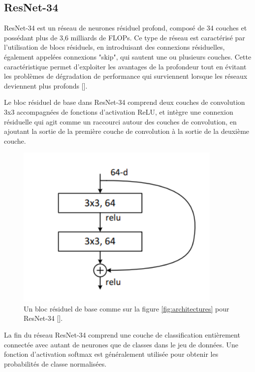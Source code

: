 \subsection{ResNet-34}
ResNet-34 est un réseau de neurones résiduel profond, composé de 34 couches et possédant plus de 3,6 milliards de FLOPs. Ce type de réseau est caractérisé par l'utilisation de blocs résiduels, en introduisant des connexions résiduelles, également appelées connexions "skip", qui sautent une ou plusieurs couches. Cette caractéristique permet d'exploiter les avantages de la profondeur tout en évitant les problèmes de dégradation de performance qui surviennent lorsque les réseaux deviennent plus profonds [\cite{He_2016_CVPR}].

Le bloc résiduel de base dans ResNet-34 comprend deux couches de convolution 3x3 accompagnées de fonctions d'activation ReLU, et intègre une connexion résiduelle qui agit comme un raccourci autour des couches de convolution, en ajoutant la sortie de la première couche de convolution à la sortie de la deuxième couche. 

\begin{figure}[hbt!]
  \centering
  \includegraphics[width=10cm]{images_pfe/residual-bloc.png}
  \caption{Un bloc résiduel de base comme sur la figure \ref{fig:architectures} pour ResNet-34 [\cite{He_2016_CVPR}].}
  \label{fig:residual-bloc}
\end{figure}
\FloatBarrier
\medskip

La fin du réseau ResNet-34 comprend une couche de classification entièrement connectée avec autant de neurones que de classes dans le jeu de données. Une fonction d'activation softmax est généralement utilisée pour obtenir les probabilités de classe normalisées.

